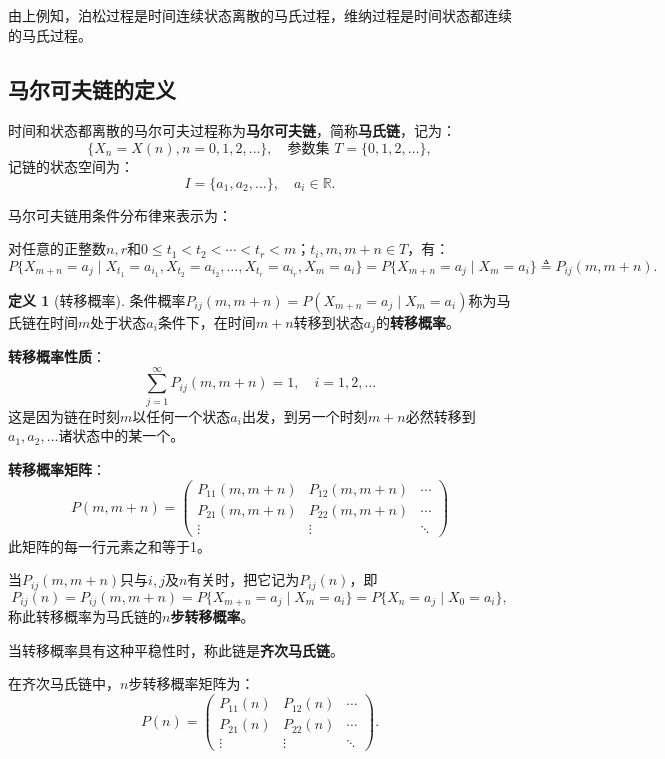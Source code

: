 \documentclass[11pt,a4paper]{report}
\theoremstyle{definition}
\newtheorem{definition}{定义}[chapter]
\begin{document}
由上例知，泊松过程是时间连续状态离散的马氏过程，维纳过程是时间状态都连续的马氏过程。

\subsection{马尔可夫链的定义}

时间和状态都离散的马尔可夫过程称为\textbf{马尔可夫链}，简称\textbf{马氏链}，记为：
\[
\{X_n=X(n),n=0,1,2,\ldots\},\quad\text{参数集 }T=\{0,1,2,\ldots\},
\]
记链的状态空间为：
\[
I=\{a_1,a_2,\ldots\},\quad a_i\in\mathbb{R}.
\]

马尔可夫链用条件分布律来表示为：

对任意的正整数$n,r$和$0\leq t_1<t_2<\cdots<t_r<m$；$t_i,m,m+n\in T$，有：
\[
P\{X_{m+n}=a_j\mid X_{t_1}=a_{i_1},X_{t_2}=a_{i_2},\ldots,X_{t_r}=a_{i_r},X_m=a_i\}=P\{X_{m+n}=a_j\mid X_m=a_i\}\triangleq P_{ij}(m,m+n).
\]

\begin{definition}[转移概率]
条件概率$P_{ij}(m,m+n)=P(X_{m+n}=a_j\mid X_m=a_i)$称为马氏链在时间$m$处于状态$a_i$条件下，在时间$m+n$转移到状态$a_j$的\textbf{转移概率}。
\end{definition}

\textbf{转移概率性质}：
\[
\sum_{j=1}^{\infty}P_{ij}(m,m+n)=1,\quad i=1,2,\ldots
\]
这是因为链在时刻$m$以任何一个状态$a_i$出发，到另一个时刻$m+n$必然转移到$a_1,a_2,\ldots$诸状态中的某一个。

\textbf{转移概率矩阵}：
\[
P(m,m+n)=
\begin{pmatrix}
P_{11}(m,m+n) & P_{12}(m,m+n) & \cdots\\
P_{21}(m,m+n) & P_{22}(m,m+n) & \cdots\\
\vdots & \vdots & \ddots
\end{pmatrix}
\]
此矩阵的每一行元素之和等于1。

当$P_{ij}(m,m+n)$只与$i,j$及$n$有关时，把它记为$P_{ij}(n)$，即
\[
P_{ij}(n)=P_{ij}(m,m+n)=P\{X_{m+n}=a_j\mid X_m=a_i\}=P\{X_n=a_j\mid X_0=a_i\},
\]
称此转移概率为马氏链的\textbf{$n$步转移概率}。

当转移概率具有这种平稳性时，称此链是\textbf{齐次马氏链}。

在齐次马氏链中，$n$步转移概率矩阵为：
\[
P(n)=
\begin{pmatrix}
P_{11}(n) & P_{12}(n) & \cdots\\
P_{21}(n) & P_{22}(n) & \cdots\\
\vdots & \vdots & \ddots
\end{pmatrix}.
\]
\end{document}
